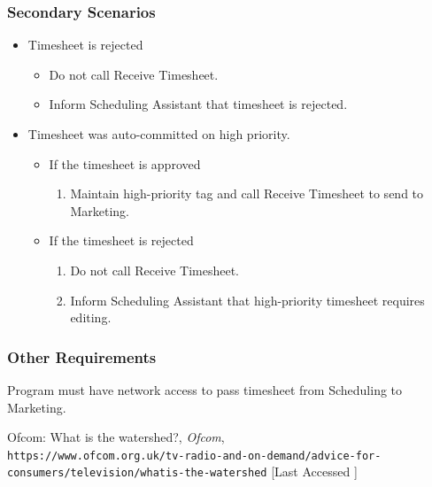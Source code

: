 \documentclass[11pt, oneside]{article}
\begin{document}
\subsubsection*{Secondary Scenarios}
\begin{itemize}
\renewcommand\labelitemi{--}
\renewcommand\labelitemii{$\circ$}
 \renewcommand{\labelenumi}{(\alph{enumi})}
 \item Timesheet is rejected
 	\begin{itemize}
	\item Do not call Receive Timesheet.
	\item Inform Scheduling Assistant that timesheet is rejected.
	\end{itemize}
\item Timesheet was auto-committed on high priority.
	\begin{itemize}
	\item If the timesheet is approved
		\begin{enumerate}
		\item Maintain high-priority tag and call Receive Timesheet to send to Marketing.
		\end{enumerate}
	\item If the timesheet is rejected
		\begin{enumerate}
		\item Do not call Receive Timesheet.
		\item Inform Scheduling Assistant that high-priority timesheet requires editing.
		\end{enumerate}
	\end{itemize}
\end{itemize}
\subsubsection*{Other Requirements}
Program must have network access to pass timesheet from Scheduling to Marketing.


\begin{thebibliography}{5}
Ofcom: What is the watershed?, \textit{Ofcom},
\\\texttt{https://www.ofcom.org.uk/tv-radio-and-on-demand/advice-for-consumers/television/what\-is-the-watershed}
[Last Accessed ]
\end{thebibliography}
\end{document}
